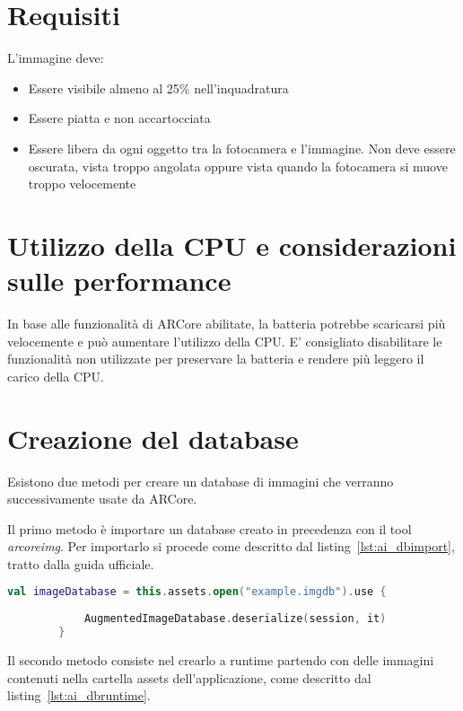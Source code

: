 \documentclass[crop=false, class=book]{standalone}
\begin{document}
	
	\section{Requisiti}
	L’immagine deve:
	\begin{itemize}
		\item Essere visibile almeno al 25\% nell'inquadratura
		\item Essere piatta e non accartocciata
		\item Essere libera da ogni oggetto tra la fotocamera e l'immagine. Non deve essere oscurata, vista troppo angolata oppure vista quando la fotocamera si muove troppo velocemente
	\end{itemize}

	
	\section{Utilizzo della CPU e considerazioni sulle performance}
	
	In base alle funzionalità di ARCore abilitate, la batteria potrebbe scaricarsi più velocemente e può aumentare l’utilizzo della CPU. E’ consigliato disabilitare le funzionalità non utilizzate per preservare la batteria e rendere più leggero il carico della CPU.
	
	\section{Creazione del database}
	Esistono due metodi per creare un database di immagini che verranno successivamente usate da ARCore.
	
	Il primo metodo è importare un database creato in precedenza con il tool \textit{arcoreimg}.
	Per importarlo si procede come descritto dal listing~\vref{lst:ai_dbimport}, tratto dalla guida ufficiale.
	
	\begin{center}
		\begin{minipage}{0.95\textwidth}
		\begin{lstlisting}[caption={Descrizione del listing.}, label={lst:ai_dbimport}, language=Kotlin]
		val imageDatabase = this.assets.open("example.imgdb").use {
			
			AugmentedImageDatabase.deserialize(session, it)
		}
		\end{lstlisting}
		\end{minipage}
	\end{center}
	
	Il secondo metodo consiste nel crearlo a runtime partendo con delle immagini contenuti nella cartella assets dell’applicazione, come descritto dal listing~\vref{lst:ai_dbruntime}.
	
\end{document}
